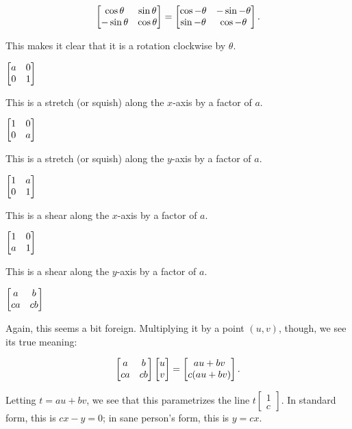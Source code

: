 \documentclass[../gatm_answers.tex]{subfiles}
\begin{document}
$$\begin{bmatrix} \cos\theta & \sin\theta \\ -\sin\theta & \cos\theta \end{bmatrix}= \begin{bmatrix} \cos-\theta & -\sin-\theta \\ \sin-\theta & \cos-\theta \end{bmatrix}.$$

This makes it clear that it is a rotation clockwise by $\theta$.

\begin{inner_problem}
\item $\begin{bmatrix} a & 0 \\ 0 & 1 \end{bmatrix}$
\end{inner_problem}

This is a stretch (or squish) along the $x$-axis by a factor of $a$.

\begin{inner_problem}
\item $\begin{bmatrix} 1 & 0 \\ 0 & a \end{bmatrix}$
\end{inner_problem}

This is a stretch (or squish) along the $y$-axis by a factor of $a$.

\begin{inner_problem}
\item $\begin{bmatrix} 1 & a \\ 0 & 1 \end{bmatrix}$
\end{inner_problem}

This is a shear along the $x$-axis by a factor of $a$.

\begin{inner_problem}
\item $\begin{bmatrix} 1 & 0 \\ a & 1 \end{bmatrix}$
\end{inner_problem}

This is a shear along the $y$-axis by a factor of $a$.

\begin{inner_problem}
\item $\begin{bmatrix} a & b \\ ca & cb \end{bmatrix}$
\end{inner_problem}

Again, this seems a bit foreign. Multiplying it by a point $(u,v)$, though, we see its true meaning:

$$\begin{bmatrix} a & b \\ ca & cb \end{bmatrix}\begin{bmatrix} u \\ v \end{bmatrix} = \begin{bmatrix} au+bv \\ c(au+bv) \end{bmatrix}.$$

Letting $t=au+bv$, we see that this parametrizes the line $t\begin{bmatrix}1 \\ c \end{bmatrix}$. In standard form, this is $cx-y=0$; in sane person's form, this is $y = cx$.
\end{document}
